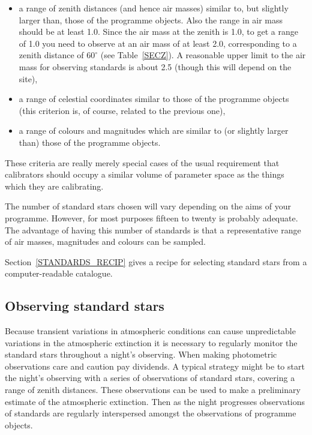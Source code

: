 \documentclass[twoside,11pt]{article}
\begin{document}
\begin{itemize}

  \item a range of zenith distances (and hence air masses) similar to,
   but slightly larger than, those of the programme objects.  Also
   the range in air mass should be at least 1.0.  Since the
   air mass at the zenith is 1.0, to get a range of 1.0 you need to
   observe at an air mass of at least 2.0, corresponding to a zenith
   distance of $60^{\circ}$ (see Table~\ref{SECZ}).  A reasonable upper
   limit to the air mass for observing standards is about 2.5 (though
   this will depend on the site),

  \item a range of celestial coordinates similar to those of the
   programme objects (this criterion is, of course, related to the
   previous one),

  \item a range of colours and magnitudes which are similar to (or
   slightly larger than) those of the programme objects.

\end{itemize}

These criteria are really merely special cases of the usual requirement
that calibrators should occupy a similar volume of parameter space as
the things which they are calibrating.

The number of standard stars chosen will vary depending on the aims of
your programme.  However, for most purposes fifteen to twenty is
probably adequate.  The advantage of having this number of standards
is that a representative range of air masses, magnitudes and colours
can be sampled.

Section~\ref{STANDARDS_RECIP} gives a recipe for selecting standard
stars from a computer-readable catalogue.

\subsection{Observing standard stars}

Because transient variations in atmospheric conditions can cause
unpredictable variations in the atmospheric extinction it is necessary
to regularly monitor the standard stars throughout a night's observing.
When making photometric observations care and caution pay dividends.  A
typical strategy might be to start the night's observing with a series
of observations of standard stars, covering a range of zenith distances.
These observations can be used to make a preliminary estimate of the
atmospheric extinction.  Then as the night progresses observations of
standards are regularly interspersed amongst the observations of
programme objects.
\end{document}
